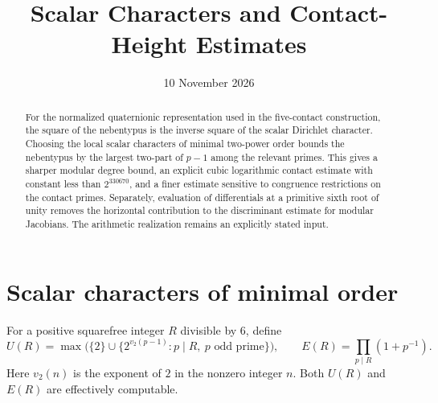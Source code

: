 \documentclass[11pt,a4paper]{article}
\title{Scalar Characters and Contact-Height Estimates}
\author{}\date{10 November 2026}
\theoremstyle{definition}\newtheorem{remark}[theorem]{Remark}
\begin{document}
\maketitle
\begin{abstract}
For the normalized quaternionic representation used in the five-contact
construction, the square of the nebentypus is the inverse square of the
scalar Dirichlet character. Choosing the local scalar characters of
minimal two-power order bounds the nebentypus by the largest two-part of
$p-1$ among the relevant primes. This gives a sharper modular degree
bound, an explicit cubic logarithmic contact estimate with constant less
than $2^{330670}$, and a finer estimate sensitive to congruence restrictions
on the contact primes. Separately, evaluation of differentials at a
primitive sixth root of unity removes the horizontal contribution to
the discriminant estimate for modular Jacobians. The arithmetic
realization remains an explicitly stated input.
\end{abstract}

\section{Scalar characters of minimal order}

For a positive squarefree integer $R$ divisible by $6$, define
\[
 U(R)=\max\bigl(\{2\}\cup
       \{2^{v_2(p-1)}:p\mid R,\ p\text{ odd prime}\}\bigr),
 \qquad E(R)=\prod_{p\mid R}(1+p^{-1}).
\]
Here $v_2(n)$ is the exponent of $2$ in the nonzero integer $n$.
Both $U(R)$ and $E(R)$ are effectively computable.
\end{document}
